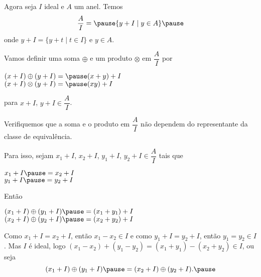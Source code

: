 \documentclass{beamer}
\begin{document}
    \begin{frame}
        Agora seja $I$ ideal \pause e $A$ um anel. \pause Temos\pause 
        \[
            \dfrac{A}{I} = \pause \{y + I \mid y \in A\}\pause 
        \]
        onde $y + I = \{y + t \mid t \in I\}$ \pause e $y \in A$.\pause 

        Vamos definir uma soma $\oplus$ \pause e um produto $\otimes$ \pause em $\dfrac{A}{I}$ por\pause 
        \begin{center}
            $(x + I) \oplus (y + I) = \pause (x + y) + I$\pause\\
            $(x + I) \otimes (y + I) = \pause (xy) + I$\pause 
        \end{center}
        para $x + I$, \pause $y + I \in \dfrac{A}{I}$.\pause
    \end{frame}

    \begin{frame}
        Verifiquemos que a soma \pause e o produto \pause em $\dfrac{A}{I}$ \pause n{\~a}o dependem do representante da classe de equival{\^e}ncia.\pause

        Para isso, \pause sejam $x_1 + I$, \pause $x_2 + I$, \pause $y_1 + I$, \pause $y_2 + I \in \dfrac{A}{I}$ \pause tais que\pause 
        \begin{center}
            $x_1 + I \pause = x_2 + I$\pause\\
            $y_1 + I \pause = y_2 + I$\pause
        \end{center}

        Ent{\~a}o\pause 
        \begin{center}
            $(x_1 + I) \oplus (y_1 + I) \pause = (x_1 + y_1) + I$\pause\\
            $(x_2 + I) \oplus (y_2 + I) \pause = (x_2 + y_2) + I$\pause
        \end{center}
    \end{frame}

    \begin{frame}
        Como $x_1 + I = x_2 + I$, \pause ent{\~a}o $x_1 - x_2 \in I$ \pause e como $y_1 + I = y_2 + I$, \pause ent{\~a}o $y_1 = y_2 \in I$. \pause Mas $I$ {\'e} ideal, \pause logo $(x_1 - x_2) + (y_1 - y_2) = (x_1 + y_1) - (x_2 + y_2) \in I$, \pause ou seja\pause 
        \[
            (x_1 + I) \oplus (y_1 + I) \pause = (x_2 + I) \oplus (y_2 + I).\pause
        \]
    \end{frame}
\end{document}
